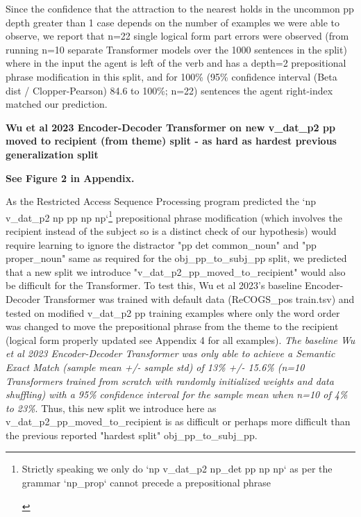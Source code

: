 \documentclass[11pt]{article}
\begin{document}
Since the confidence that the attraction to the nearest holds in the uncommon pp depth greater than 1 case depends on the number of examples we were able to observe, we report that n=22 single logical form part errors were observed (from running n=10 separate Transformer models over the 1000 sentences in the split) where in the input the agent is left of the verb and has a depth=2 prepositional phrase modification in this split, and for 100\% (95\% confidence interval (Beta dist / Clopper-Pearson) 84.6 to 100\%; n=22) sentences the agent right-index matched our prediction.

\textbf{Wu et al 2023 Encoder-Decoder Transformer on new v\_dat\_p2 pp moved to recipient (from theme) split - as hard as hardest previous generalization split}

\textbf{See Figure 2 in Appendix.}

As the Restricted Access Sequence Processing program predicted the `np v\_dat\_p2 np pp np np`\footnote{
\begin{tiny}
Strictly speaking we only do `np v\_dat\_p2 np\_det pp np np` as per the grammar `np\_prop` cannot precede a prepositional phrase
\end{tiny}
} prepositional phrase modification (which involves the recipient instead of the subject so is a distinct check of our hypothesis) would require learning to ignore the distractor "pp det common\_noun" and "pp proper\_noun" same as required for the obj\_pp\_to\_subj\_pp split, we predicted that a new split we introduce "v\_dat\_p2\_pp\_moved\_to\_recipient" would also be difficult for the Transformer. To test this, Wu et al 2023's baseline Encoder-Decoder Transformer was trained with default data (ReCOGS\_pos train.tsv) and tested on modified v\_dat\_p2 pp training examples where only the word order was changed to move the prepositional phrase from the theme to the recipient (logical form properly updated see Appendix 4 for all examples). \textit{The baseline Wu et al 2023 Encoder-Decoder Transformer was only able to achieve a Semantic Exact Match (sample mean +/- sample std) of 13\% +/- 15.6\% (n=10 Transformers trained from scratch with randomly initialized weights and data shuffling) with a 95\% confidence interval for the sample mean when n=10 of 4\% to 23\%}. Thus, this new split we introduce here as v\_dat\_p2\_pp\_moved\_to\_recipient is as difficult or perhaps more difficult than the previous reported "hardest split" obj\_pp\_to\_subj\_pp.

\end{document}
